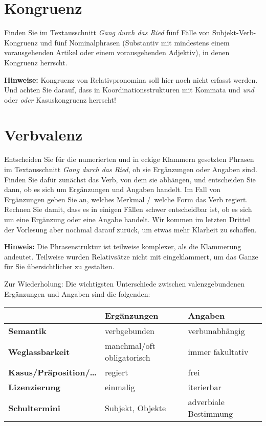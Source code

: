 \section{Kongruenz}

Finden Sie im Textausschnitt \textit{Gang durch das Ried} fünf Fälle von Subjekt-Verb-Kongruenz und fünf Nominalphrasen (Substantiv mit mindestens einem vorausgehenden Artikel oder einem vorausgehenden Adjektiv), in denen Kongruenz herrscht.

\textbf{Hinweise:} Kongruenz von Relativpronomina soll hier noch nicht erfasst werden. Und achten Sie darauf, dass in Koordinationsstrukturen mit Kommata und \textit{und} oder \textit{oder} Kasuskongruenz herrscht!

\section{Verbvalenz}

Entscheiden Sie für die numerierten und in eckige Klammern gesetzten Phrasen im Textausschnitt \textit{Gang durch das Ried}, ob sie Ergänzungen oder Angaben sind.
Finden Sie dafür zunächst das Verb, von dem sie abhängen, und entscheiden Sie dann, ob es sich um Ergänzungen und Angaben handelt.
Im Fall von Ergänzungen geben Sie an, welches Merkmal \slash\ welche Form das Verb regiert.
Rechnen Sie damit, dass es in einigen Fällen schwer entscheidbar ist, ob es sich um eine Ergänzung oder eine Angabe handelt.
Wir kommen im letzten Drittel der Vorlesung aber nochmal darauf zurück, um etwas mehr Klarheit zu schaffen.

\textbf{Hinweis:} Die Phrasenstruktur ist teilweise komplexer, als die Klammerung andeutet.
Teilweise wurden Relativsätze nicht mit eingeklammert, um das Ganze für Sie übersichtlicher zu gestalten.

Zur Wiederholung: Die wichtigsten Unterschiede zwischen valenzgebundenen Ergänzungen und Angaben sind die folgenden:

\Zeile

\begin{center}
  \begin{tabular}[h]{lll}
    \toprule
    & \textbf{Ergänzungen} & \textbf{Angaben} \\
    \midrule
    \textbf{Semantik} & verbgebunden & verbunabhängig \\
    \textbf{Weglassbarkeit} & manchmal\slash oft obligatorisch & immer fakultativ \\
    \textbf{Kasus\slash Präposition\slash\ldots} & regiert & frei \\
    \textbf{Lizenzierung} & einmalig & iterierbar \\
    \midrule
    \textbf{Schultermini} & Subjekt, Objekte & adverbiale Bestimmung \\
    \bottomrule
  \end{tabular}
\end{center}

